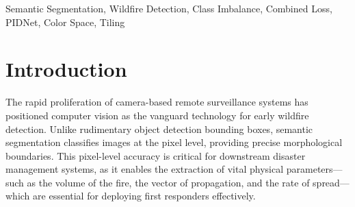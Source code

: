 \documentclass[conference]{IEEEtran}
\begin{document}
\begin{abstract}
Automated detection of fire and smoke via remote camera networks is critical for mitigating the impact of wildfires. While semantic segmentation models offer precise pixel-level boundaries, their deployment is severely hindered by extreme dataset imbalances. In wildfire imagery, the target objects occupy a minuscule fraction of the high-resolution frame, and there exists a drastic intra-class imbalance where diffuse smoke heavily outnumbers active flame fronts. In this paper, we empirically demonstrate that naive segmentation pipelines catastrophically fail on the minority flame class, achieving a mere 62.1\% Fire mIoU on the FIgLib dataset. To solve this, we propose an optimization pipeline centered on a custom Combined Loss formulation (Lovasz-Softmax, Focal, and Dice) that explicitly rescues the minority class, boosting Fire mIoU to 79.9\%. Furthermore, we introduce secondary data-centric optimizations---namely, an RGCr color space transformation and a Balanced SAHI-style Tiling algorithm---that force the network to prioritize the thermal signatures of active flames over diffuse smoke. Our ablation studies reveal a critical trade-off: while the Combined Loss alone yields the highest overall accuracy (79.9\% Fire+Smoke mIoU), appending our RGCr and Tiling strategies successfully pushes Fire mIoU to a state-of-the-art 81.1\%, sacrificing a fraction of smoke boundary precision to guarantee the detection of critical combustion events.
\end{abstract}

\begin{IEEEkeywords}
Semantic Segmentation, Wildfire Detection, Class Imbalance, Combined Loss, PIDNet, Color Space, Tiling
\end{IEEEkeywords}

\section{Introduction}
The rapid proliferation of camera-based remote surveillance systems has positioned computer vision as the vanguard technology for early wildfire detection. Unlike rudimentary object detection bounding boxes, semantic segmentation classifies images at the pixel level, providing precise morphological boundaries. This pixel-level accuracy is critical for downstream disaster management systems, as it enables the extraction of vital physical parameters—such as the volume of the fire, the vector of propagation, and the rate of spread—which are essential for deploying first responders effectively.
\end{document}

